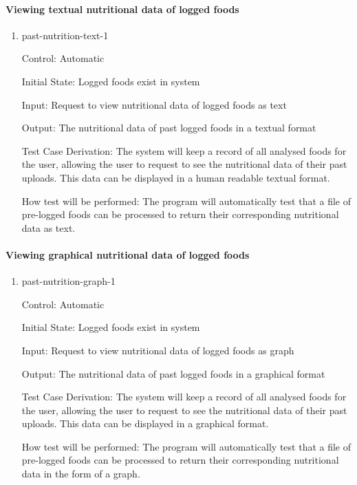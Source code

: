 \documentclass[12pt, titlepage]{article}
\begin{document}
	\paragraph{Viewing textual nutritional data of logged foods}
	
	\begin{enumerate}
		
		\item{past-nutrition-text-1\\}
		
		Control: Automatic
		
		Initial State: Logged foods exist in system
		
		Input: Request to view nutritional data of logged foods as text
		
		Output: The nutritional data of past logged foods in a textual format
		
		Test Case Derivation: The system will keep a record of all analysed foods for the user, allowing the user to request to see the nutritional data of their past uploads. This data can be displayed in a human readable textual format.
		
		How test will be performed: The program will automatically test that a file of pre-logged foods can be processed to return their corresponding nutritional data as text.
		
	\end{enumerate}
	
	\paragraph{Viewing graphical nutritional data of logged foods}
	
	\begin{enumerate}
		
		\item{past-nutrition-graph-1\\}
		
		Control: Automatic
		
		Initial State: Logged foods exist in system
		
		Input: Request to view nutritional data of logged foods as graph
		
		Output: The nutritional data of past logged foods in a graphical format
		
		Test Case Derivation: The system will keep a record of all analysed foods for the user, allowing the user to request to see the nutritional data of their past uploads. This data can be displayed in a graphical format.
		
		How test will be performed: The program will automatically test that a file of pre-logged foods can be processed to return their corresponding nutritional data in the form of a graph.
		
	\end{enumerate}
	
\end{document}
